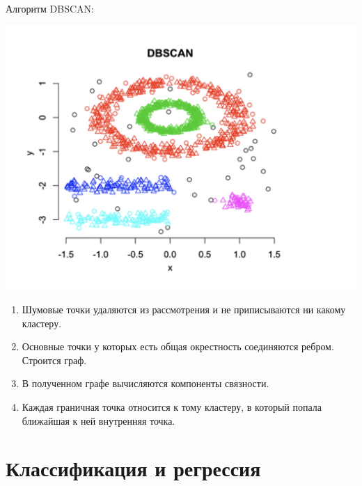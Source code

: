 \documentclass[a4paper, oneside]{book}
\begin{document}
Алгоритм DBSCAN:
\begin{marginfigure}
    \includegraphics[width=1.3\columnwidth]{pics/dbscan.jpeg}
    \label{fig:boxplot}
\end{marginfigure}
\begin{enumerate}
    \item Шумовые точки удаляются из рассмотрения и не приписываются ни какому
        кластеру.

    \item Основные точки у которых есть общая окрестность соединяются ребром.
        Строится граф.

    \item В полученном графе вычисляются компоненты связности.

    \item Каждая граничная точка относится к тому кластеру, в который попала
        ближайшая к ней внутренняя точка.
\end{enumerate}

\chapter{Классификация и регрессия}
\end{document}
